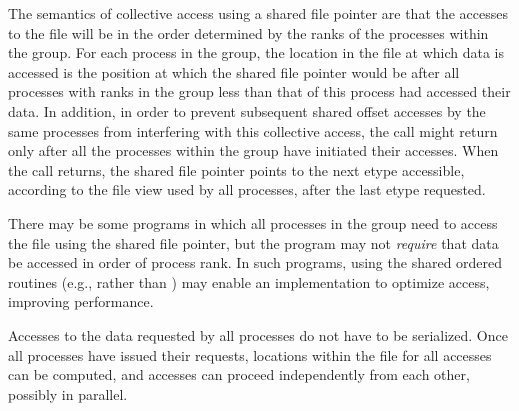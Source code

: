 The semantics of collective access using a shared file pointer are
that the accesses to the file will be
in the order determined by the ranks of the processes
within the group.
For each process in the group, the location in the file at which data is accessed is the 
position at which the shared file pointer would be after all processes with 
ranks in the group less than that of this process had accessed their data.
In addition, in order to prevent subsequent
shared offset accesses by the same processes from interfering
with this collective 
access, the call might return only after all the processes 
within the group have initiated their 
accesses.
When the call returns, the shared file pointer points
to the next etype accessible,
according to the file view used by all processes,
after the last etype requested.

\begin{users}
There may be some programs in which all processes in the
group
need to access the
file using the shared file pointer, but the program may not \emph{require}
that data be accessed in order of process rank.
In such programs, using the shared ordered routines
(e.g., 
rather than )
may enable an implementation to optimize access, improving performance.
\end{users}

\begin{implementors}
Accesses to the data requested by all processes do not have to be serialized. 
Once all processes have issued their requests, locations within the file for
all accesses can be computed, and accesses can proceed independently from each
other, possibly in parallel.
\end{implementors}



